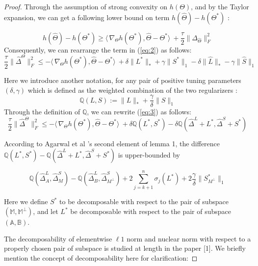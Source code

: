 \documentclass[AMS,STIX1COL]{WileyNJD-v2}
\begin{document}
\begin{proof}
Through the assumption of strong convexity on $h(\Theta)$, and by the Taylor expansion, we can get a following lower bound on term $h(\hat{\Theta})-h(\Theta^{*})$ :

\begin{equation}
\label{eq:2}
h(\hat{\Theta})-h(\Theta^{*}) \geq
\langle\, \nabla_{\Theta}h(\Theta^{*}),\hat{\Theta}-\Theta^{*}\rangle\
+ \frac{\tau}{2}\|\Delta_{\hat{\Theta}}\|_{F}^{2}
\end{equation}
Consequently, we can rearrange the term in (\ref{eq:2}) as follows:
\begin{equation}\label{eq:3}
    \frac{\tau}{2}\|\hat{\Delta}^{\Theta}\|_{F}^{2} \leq
    -\langle\,\nabla_{\Theta}h(\Theta^{*}),\hat{\Theta}-\Theta^{*}\rangle\
    + \delta \|L^{*}\|_\ast + \gamma \|S^{*}\|_1
    - \delta \|\hat{L}\|_\ast - \gamma \|\hat{S}\|_1
\end{equation}

Here we introduce another notation, for any pair of positive tuning parameters $(\delta,\gamma)$ which is defined as the weighted combination of the two regularizers :
\[
\mathbb{Q}(L,S)   := \|L\|_{*} + \frac{\gamma}{\delta}\|S\|_1
\]
Through the definition of $\mathbb{Q}$, we can rewrite (\ref{eq:3}) as follows:
\begin{equation}\label{eq:4}
    \frac{\tau}{2}\|\hat{\Delta}^{\Theta}\|_{F}^{2} \leq
    -\langle\,\nabla_{\Theta}h(\Theta^{*}),\hat{\Theta}-\Theta^{*}\rangle\
    + \delta \mathbb{Q}(L^{*},S^{*}) - \delta \mathbb{Q}(\hat{\Delta}^L + L^{*},\hat{\Delta}^S + S^{*})
\end{equation}

According to Agarwal et al \cite{agarwal2012noisy}'s second element of lemma 1,
the difference $\mathbb{Q}(L^*,S^*)- \mathbb{Q}(\hat{\Delta}^L + L^{*},\hat{\Delta}^S + S^{*})$ is upper-bounded by

\begin{equation}\label{eq:5}
    \mathbb{Q}(\hat{\Delta}^L_{A},\hat{\Delta}^S_{M}) - \mathbb{Q}(\hat{\Delta}^L_{B},\hat{\Delta}^S_{M^\perp})
    +2 \sum_{j=k+1}^{n} \sigma_{j}(L^*) + 2\frac{\gamma}{\delta}\|S^*_{M^\perp}\|_{1}
\end{equation}

Here we define $S^{*}$ to be decomposable with respect to the pair of subspace $(\mathbb{M},\mathbb{M}^{\perp})$, and let $L^{*}$ be decomposable with respect to the pair of subspace $(\mathbb{A},\mathbb{B})$.

The decomposability of elementwise $\ell 1$ norm and nuclear norm with respect to a properly chosen pair of subspace is studied at length in the paper [1]. 
We briefly mention the concept of decomposability here for clarification:


\end{proof}
\end{document}
